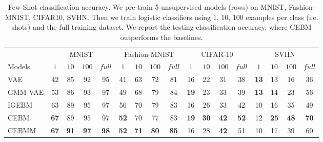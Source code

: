 \documentclass{article}
\begin{document}
\setlength{\tabcolsep}{5pt}
\begin{table}[!t]
\caption{Few-Shot classification accuracy. We pre-train 5 unsupervised models (rows) on MNIST, Fashion-MNIST, CIFAR10, SVHN. Then we train logistic classifiers using 1, 10, 100 examples per class (i.e. shots) and the full training dataset. We report the testing classification accuracy, where CEBM outperforms the baselines.}
\centering
\begin{tabular}{l|cccc|cccc|cccc|cccc}
\toprule
 & \multicolumn{4}{c}{MNIST} & \multicolumn{4}{|c}{Fashion-MNIST} & \multicolumn{4}{|c}{CIFAR-10} & \multicolumn{4}{|c}{SVHN}\\
Models & $1$ & $10$  & $100$ & $full$ & $1$ & $10$  & $100$ & $full$ & $1$ & $10$  & $100$ & $full$ & $1$ & $10$  & $100$ & $full$ \\
\midrule
\midrule
VAE & 42 & 85 & 92 & 95 & 41 & 63 & 72 & 81 & 16 & 22 & 31 & 38 & \textbf{13} & 13 & 16 & 36\\
GMM-VAE & 53 & 86 & 93 & 97 & 49 & 68 & 79 & 84 & \textbf{19} & 23 & 33 & 39 & \textbf{13} & 14 & 23 & 56  \\
\midrule
IGEBM & 63 & 89 & 95 & 97 & 50 & 70 & 79 & 83 & 16 & 26 & 33 & 42 & 10 & 16 & 35 & 49\\
CEBM & \textbf{67} & 89 & 95 & 97 & \textbf{52} & 70 & 77 & 83 & \textbf{19} & \textbf{30} & \textbf{42} & \textbf{52} & 12 & \textbf{25} & \textbf{48} & \textbf{70}\\
CEBMM & \textbf{67} & \textbf{91} & \textbf{97} & \textbf{98} &\textbf{52} & \textbf{71} & \textbf{80} & \textbf{85} & 16 & 28 & \textbf{42} & 51 & 10 & 17 & 39 & 60 \\
\bottomrule
\end{tabular}
\label{tab:few-shot classification}
\end{table}
\end{document}
